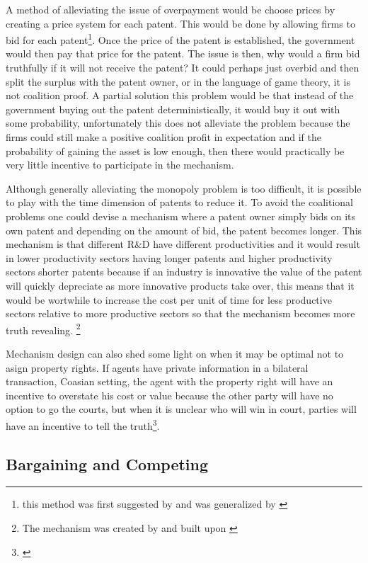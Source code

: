 \documentclass[12pt]{article}
\numberwithin{equation}{section}
\begin{document}
A method of alleviating the issue of overpayment would be choose prices by creating a price system for each patent. This would be done by allowing firms to bid for each patent\footnote{this method was first suggested by\cite{kremer_1998} and was generalized by \cite{weyl2012market}}. Once the price of the patent is established, the government would then pay that price for the patent. The issue is then, why would a firm bid truthfully if it will not receive the patent? It could perhaps just overbid and then split the surplus with the patent owner, or in the language of game theory, it is not coalition proof. A partial solution this problem would be that instead of the government buying out the patent deterministically, it would buy it out with some probability, unfortunately this does not alleviate the problem because the firms could still make a positive coalition profit in expectation and if the probability of gaining the asset is low enough, then there would practically be very little incentive to participate in the mechanism. 

Although generally alleviating the monopoly problem is too difficult, it is possible to play with the time dimension of patents to reduce it. To avoid the coalitional problems one could devise a mechanism where a patent owner simply bids on its own patent and depending on the amount of bid, the patent becomes longer. This mechanism is that different R\&D have different productivities and it would result in lower productivity sectors having longer patents and higher productivity sectors shorter patents because if an industry is innovative the value of the patent will quickly depreciate as more innovative products take over, this means that it would be wortwhile to increase the cost per unit of time for less productive sectors relative to more productive sectors so that the mechanism becomes more truth revealing.  \footnote{ The mechanism was created by \cite{Scotchmer1999} and built upon \cite{Cornelli1999}}

Mechanism design can also shed some light on when it may be optimal not to asign property rights. If agents have private information in a bilateral transaction, Coasian setting, the agent with the property right will have an incentive to overstate his cost or value because the other party will have no option to go the courts, but when it is unclear who will win in court, parties will have an incentive to tell the truth\footnote{\cite{schmitz2001coase}}. 

\subsection{Bargaining and Competing}
\end{document}
